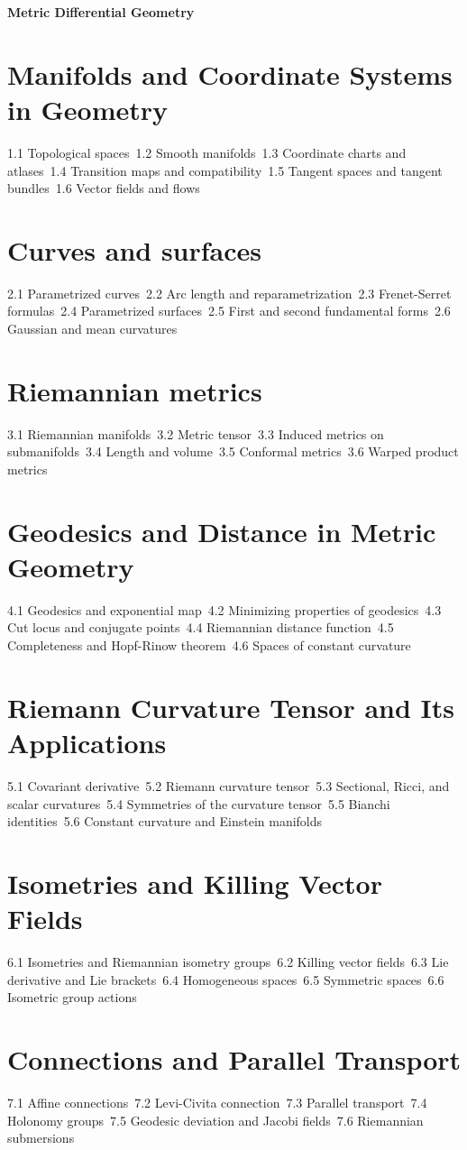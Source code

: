 {\LARGE \bf{Metric Differential Geometry}}
\section{Manifolds and Coordinate Systems in Geometry}
1.1 Topological spaces\
1.2 Smooth manifolds\
1.3 Coordinate charts and atlases\
1.4 Transition maps and compatibility\
1.5 Tangent spaces and tangent bundles\
1.6 Vector fields and flows\
\section{Curves and surfaces}
2.1 Parametrized curves\
2.2 Arc length and reparametrization\
2.3 Frenet-Serret formulas\
2.4 Parametrized surfaces\
2.5 First and second fundamental forms\
2.6 Gaussian and mean curvatures\
\section{Riemannian metrics}
3.1 Riemannian manifolds\
3.2 Metric tensor\
3.3 Induced metrics on submanifolds\
3.4 Length and volume\
3.5 Conformal metrics\
3.6 Warped product metrics\
\section{Geodesics and Distance in Metric Geometry}
4.1 Geodesics and exponential map\
4.2 Minimizing properties of geodesics\
4.3 Cut locus and conjugate points\
4.4 Riemannian distance function\
4.5 Completeness and Hopf-Rinow theorem\
4.6 Spaces of constant curvature\
\section{Riemann Curvature Tensor and Its Applications}
5.1 Covariant derivative\
5.2 Riemann curvature tensor\
5.3 Sectional, Ricci, and scalar curvatures\
5.4 Symmetries of the curvature tensor\
5.5 Bianchi identities\
5.6 Constant curvature and Einstein manifolds\
\section{Isometries and Killing Vector Fields}
6.1 Isometries and Riemannian isometry groups\
6.2 Killing vector fields\
6.3 Lie derivative and Lie brackets\
6.4 Homogeneous spaces\
6.5 Symmetric spaces\
6.6 Isometric group actions\
\section{Connections and Parallel Transport}
7.1 Affine connections\
7.2 Levi-Civita connection\
7.3 Parallel transport\
7.4 Holonomy groups\
7.5 Geodesic deviation and Jacobi fields\
7.6 Riemannian submersions\
